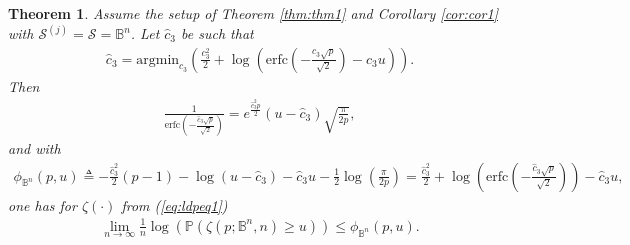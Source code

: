 \documentclass[10pt]{article}
\def\erfc{\mbox{erfc}}
\def\mB{{\mathbb B}}
\def\mP{{\mathbb P}}
\def\lp{\left (}
\def\rp{\right )}
\def\cS{{\mathcal S}}
\newtheorem{theorem}{Theorem}
\begin{document}
\begin{theorem}
  \label{thm:thm4}
 Assume the setup of Theorem \ref{thm:thm1} and Corollary \ref{cor:cor1}  with $\cS^{(j)} = \cS = \mB^n$. Let $\hat{c}_3$ be such that
 \begin{eqnarray}
 \label{eq:thmeq00a}
\hat{c}_3 = \mbox{argmin}_{c_3} \lp  \frac{c^2_{3}}{2}  + \log  \lp  \erfc  \lp -\frac{c_3\sqrt{p}}{\sqrt{2}} \rp -c_3 u \rp
 \rp.
\end{eqnarray}
Then 
 \begin{eqnarray}
 \label{eq:thmeq00}
  \frac{1}{ \erfc  \lp -\frac{\hat{c}_3\sqrt{p}}{\sqrt{2}} \rp }  = e^{\frac{\hat{c}_3^2p}{2}}( u - \hat{c}_3 )\sqrt{\frac{\pi}{2p}},
  \end{eqnarray}
and with
 \begin{eqnarray}
 \label{eq:thm4eq0}
 \phi_{\mB^n}(p,u)
   \triangleq
 - \frac{\hat{c}_{3}^2}{2}(p-1)  -   \log  \lp u-\hat{c}_3 \rp
- \hat{c}_3 u -\frac{1}{2}\log\lp \frac{\pi}{2p}\rp
=
  \frac{\hat{c}_{3}^2}{2}  +  \log  \lp  \erfc  \lp -\frac{\hat{c}_3\sqrt{p}}{\sqrt{2}} \rp  \rp -\hat{c}_3 u,
 \end{eqnarray}
one has for $\zeta(\cdot)$ from  (\ref{eq:ldpeq1}) 
 \begin{eqnarray}
 \label{eq:thm4eq1}
 \lim_{n\rightarrow \infty }  \frac{1}{n} \log \lp \mP \lp \zeta(p;\mB^n,n) \geq u \rp \rp  \leq \phi_{\mB^n}(p,u) .
  \end{eqnarray}
\end{theorem}
\end{document}
